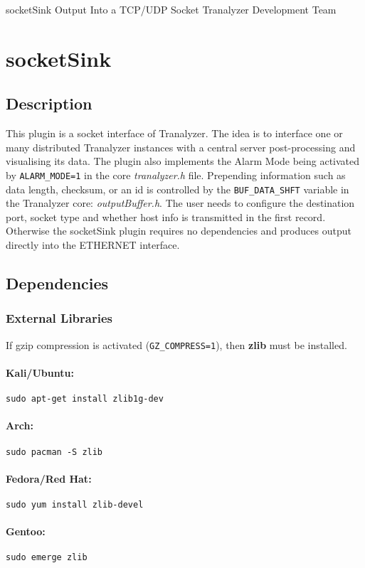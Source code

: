 \documentclass[documentation]{subfiles}
\begin{document}
\trantitle
    {socketSink}
    {Output Into a TCP/UDP Socket}
    {Tranalyzer Development Team}

\section{socketSink}\label{s:socketSink}

\subsection{Description}
This plugin is a socket interface of Tranalyzer. The idea is to interface one or many distributed Tranalyzer instances
with a central server post-processing and visualising its data. The plugin also implements the Alarm Mode being activated
by {\tt ALARM\_MODE=1} in the core {\em tranalyzer.h} file. Prepending information such as data length, checksum, or an id is controlled by the
{\tt BUF\_DATA\_SHFT} variable in the Tranalyzer core: {\em outputBuffer.h}. The user needs to configure the destination port, socket type
and whether host info is transmitted in the first record. Otherwise the socketSink plugin requires no dependencies
and produces output directly into the ETHERNET interface.

\subsection{Dependencies}

\subsubsection{External Libraries}
If gzip compression is activated ({\tt GZ\_COMPRESS=1}), then {\bf zlib} must be installed.

\paragraph{Kali/Ubuntu:} {\tt sudo apt-get install zlib1g-dev}
\paragraph{Arch:} {\tt sudo pacman -S zlib}
\paragraph{Fedora/Red Hat:} {\tt sudo yum install zlib-devel}
\paragraph{Gentoo:} {\tt sudo emerge zlib}
\end{document}
